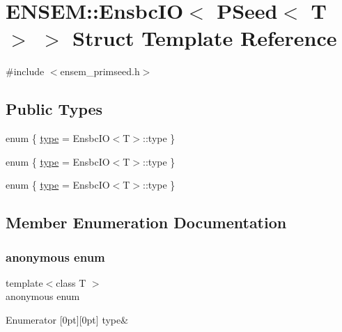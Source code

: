 \hypertarget{structENSEM_1_1EnsbcIO_3_01PSeed_3_01T_01_4_01_4}{}\section{E\+N\+S\+EM\+:\+:Ensbc\+IO$<$ P\+Seed$<$ T $>$ $>$ Struct Template Reference}
\label{structENSEM_1_1EnsbcIO_3_01PSeed_3_01T_01_4_01_4}


{\ttfamily \#include $<$ensem\+\_\+primseed.\+h$>$}

\subsection*{Public Types}
\begin{DoxyCompactItemize}
\item 
enum \{ \mbox{\hyperlink{structENSEM_1_1EnsbcIO_3_01PSeed_3_01T_01_4_01_4_a9db5bbad496c77c1e94fb06669321370a1d0ff116fce48938950c1c1cf00d6c59}{type}} = Ensbc\+IO$<$T$>$\+:\+:type
 \}
\item 
enum \{ \mbox{\hyperlink{structENSEM_1_1EnsbcIO_3_01PSeed_3_01T_01_4_01_4_a9db5bbad496c77c1e94fb06669321370a1d0ff116fce48938950c1c1cf00d6c59}{type}} = Ensbc\+IO$<$T$>$\+:\+:type
 \}
\item 
enum \{ \mbox{\hyperlink{structENSEM_1_1EnsbcIO_3_01PSeed_3_01T_01_4_01_4_a9db5bbad496c77c1e94fb06669321370a1d0ff116fce48938950c1c1cf00d6c59}{type}} = Ensbc\+IO$<$T$>$\+:\+:type
 \}
\end{DoxyCompactItemize}


\subsection{Member Enumeration Documentation}
\mbox{\label{structENSEM_1_1EnsbcIO_3_01PSeed_3_01T_01_4_01_4_a49f19193ce9db32abc1719c7cd9ef660}} 
\subsubsection{\texorpdfstring{anonymous enum}{anonymous enum}}
{\footnotesize\ttfamily template$<$class T $>$ \\
anonymous enum}

\begin{DoxyEnumFields}{Enumerator}
[0pt][0pt]{}\mbox{\label{structENSEM_1_1EnsbcIO_3_01PSeed_3_01T_01_4_01_4_a9db5bbad496c77c1e94fb06669321370a1d0ff116fce48938950c1c1cf00d6c59}} 
type&\\
\hline

\end{DoxyEnumFields}
\mbox{\label{structENSEM_1_1EnsbcIO_3_01PSeed_3_01T_01_4_01_4_a58a45aea37dcb681ef17ed266f4aa452}} 
